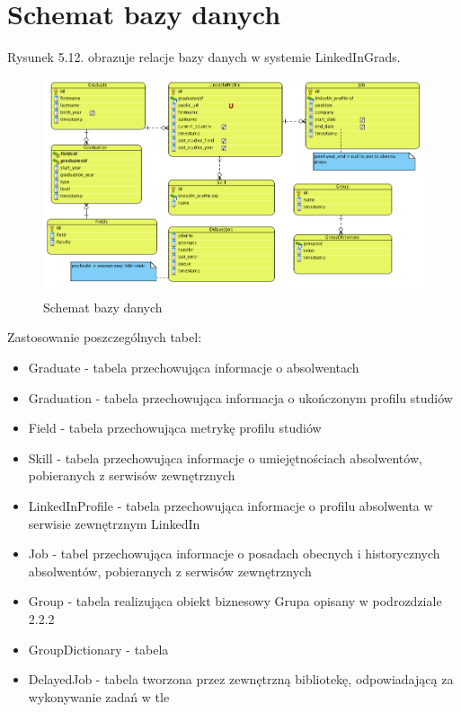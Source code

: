 \section{Schemat bazy danych}

Rysunek 5.12. obrazuje relacje bazy danych w systemie LinkedInGrads.

\begin{figure}[H] 
\centering\includegraphics[width=15cm]{figures/image13}
\caption{Schemat bazy danych}\label{rys:use-case-diagram}
\end{figure}

Zastosowanie poszczególnych tabel:

\begin{itemize}
\item Graduate - tabela przechowująca informacje o absolwentach
\item Graduation - tabela przechowująca informacja o ukończonym profilu studiów
\item Field - tabela przechowująca metrykę profilu studiów
\item Skill - tabela przechowująca informacje o umiejętnościach absolwentów, pobieranych z serwisów zewnętrznych
\item LinkedInProfile - tabela przechowująca informacje o profilu absolwenta w serwisie zewnętrznym LinkedIn
\item Job - tabel przechowująca informacje o posadach obecnych i historycznych absolwentów, pobieranych z serwisów zewnętrznych
\item Group - tabela realizująca obiekt biznesowy Grupa opisany w podrozdziale 2.2.2
\item GroupDictionary - tabela 
\item DelayedJob - tabela tworzona przez zewnętrzną bibliotekę, odpowiadającą za wykonywanie zadań w tle
\end{itemize}